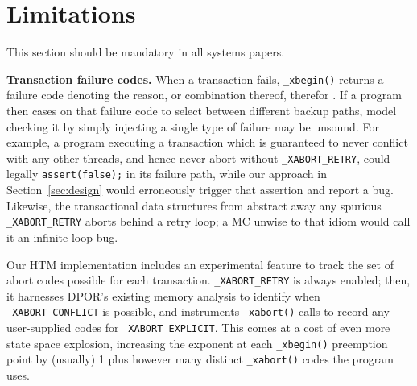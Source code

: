 \documentclass[10pt]{sigplanconf}
\begin{document}

\section{Limitations}
\label{sec:warpzone}

This section should be mandatory in all systems papers.

{\bf Transaction failure codes.}
When a transaction fails, {\tt \_xbegin()} returns a failure code
denoting the reason, or combination thereof, therefor \cite{htm-gcc}.
If a program then cases on that failure code to select between different backup paths,
model checking it by simply injecting a single type of failure may be unsound.
For example, a program executing a transaction which is guaranteed to never conflict with any other threads,
and hence never abort without {\tt \_XABORT\_RETRY},
could legally {\tt assert(false);} in its failure path,
while our approach in Section~\ref{sec:design} would erroneously trigger that assertion and report a bug.
Likewise, the transactional data structures from \cite{htm-mario}
abstract away any spurious {\tt \_XABORT\_RETRY} aborts behind a retry loop;
a MC unwise to that idiom would call it an infinite loop bug.

Our HTM implementation includes an experimental feature
to track the set of abort codes possible for each transaction.
{\tt \_XABORT\_RETRY} is always enabled;
then,
it harnesses DPOR's existing memory analysis to identify when {\tt \_XABORT\_CONFLICT} is possible,
and instruments {\tt \_xabort()} calls to record any user-supplied codes for {\tt \_XABORT\_EXPLICIT}.
This comes at a cost of even more state space explosion,
increasing the exponent at each {\tt \_xbegin()} preemption point
by (usually) 1 plus however many distinct {\tt \_xabort()} codes the program uses.
\end{document}
